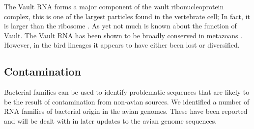 \documentclass[10pt]{bmc_article}
\newenvironment{bmcformat}{\begin{raggedright}\baselineskip20pt\sloppy\setboolean{publ}{false}}{\end{raggedright}\baselineskip20pt\sloppy}
\begin{document}
\begin{bmcformat}
The Vault RNA forms a major component of the vault ribonucleoprotein
complex, this is one of the largest particles found in the vertebrate
cell; In fact, it is larger than the ribosome \cite{Kong:1999}. As yet
not much is known about the function of Vault. The Vault RNA has been
shown to be broadly conserved in metazoans
\cite{Stadler:2009}. However, in the bird lineages it appears to have
either been lost or diversified.


\subsection*{Contamination}

Bacterial families can be used to identify problematic sequences that
are likely to be the result of contamination from non-avian
sources. We identified a number of RNA families of bacterial origin in
the avian genomes. These have been reported and will be dealt with in
later updates to the avian genome sequences.



{
  } %


\clearpage
\newpage


\end{bmcformat}
\end{document}
